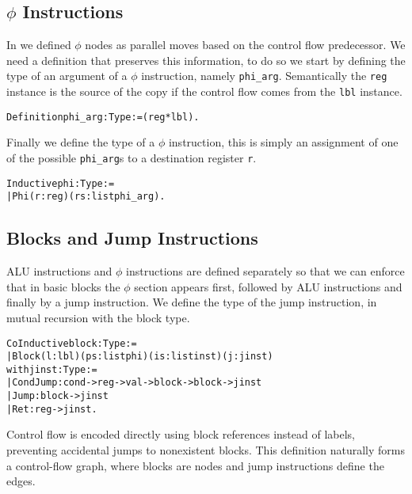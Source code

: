 \subsection{$\phi$ Instructions}

In  we defined $\phi$ nodes as parallel moves based on the control flow predecessor.
We need a definition that preserves this information, to do so we start by defining the type of an argument of a $\phi$ instruction, namely \texttt{phi\_arg}. Semantically the \texttt{reg} instance is the source of the copy if the control flow comes from the \texttt{lbl} instance.

\begin{alltt}
Definition phi_arg : Type := (reg * lbl).
\end{alltt}

Finally we define the type of a $\phi$ instruction, this is simply an assignment of one of the possible \texttt{phi\_arg}s to a destination register \texttt{r}.

\begin{alltt}
Inductive phi : Type :=
| Phi (r : reg) (rs: list phi_arg).
\end{alltt}


\subsection{Blocks and Jump Instructions}

ALU instructions and $\phi$ instructions are defined separately so that we can enforce that in basic blocks the $\phi$ section appears first, followed by ALU instructions and finally by a jump instruction.
We define the type of the jump instruction, in mutual recursion with the block type.

\begin{alltt}
CoInductive block : Type :=
  | Block (l : lbl) (ps : list phi) (is : list inst) (j : jinst)
with jinst : Type :=
  | CondJump : cond -> reg -> val -> block -> block -> jinst
  | Jump : block -> jinst
  | Ret : reg -> jinst.
\end{alltt}

Control flow is encoded directly using block references instead of labels, preventing accidental jumps to nonexistent blocks. This definition naturally forms a control-flow graph, where blocks are nodes and jump instructions define the edges.

